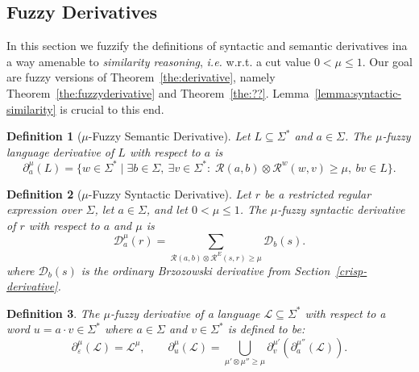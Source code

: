 \documentclass{article}
\def\ie{{\em i.e. }}
\newcommand{\cR}{{\mathcal R}}
\def\cut{\mu}
\newtheorem{definition}{Definition}[section]
\begin{document}

\subsection{Fuzzy Derivatives}\label{sec:fuzzyderivatives}
In this section we fuzzify the definitions of syntactic and semantic derivatives ina a way amenable to {\em similarity reasoning}, \ie  w.r.t. a cut value $0<\mu\leq 1$. Our goal are fuzzy versions  of Theorem~\ref{the:derivative}, namely Theorem~\ref{the:fuzzyderivative} and Theorem~\ref{the:??}. Lemma~\ref{lemma:syntactic-similarity} is crucial to this end. 

\begin{definition}[$\mu$-Fuzzy Semantic Derivative]\label{fuzzyderivative}
Let ${L}\subseteq\Sigma^*$ and $a\in\Sigma$. The \emph{$\cut$-fuzzy
language derivative} of ${L}$ with respect to $a$ is
$$
\partial_a^\cut({L})
=
\{w \in \Sigma^* \mid
  \exists b \in \Sigma,\ \exists v\in\Sigma^*
  :\;
  \cR(a,b)\otimes \mathcal{R}^w(w,v)\ge\cut,\ bv \in {L}
\}.
$$
\end{definition}

\begin{definition}[$\mu$-Fuzzy Syntactic Derivative]\label{def:regex-fuzzy-derivative}
Let $r$ be a restricted regular expression over $\Sigma$, let $a\in\Sigma$, and let
$0<\cut\le 1$. The \emph{$\mu$-fuzzy syntactic derivative} of $r$ with respect to $a$ and
$\cut$ is
\[
  \mathcal D_a^\cut(r)
  =
  \sum_{\mathcal R(a, b)\otimes \mathcal R^{E}( s, r)\geq \mu}
  \mathcal D_b(s).
\]
where $\mathcal D_b(s)$ is the ordinary Brzozowski derivative from
Section~\ref{crisp-derivative}. 
\end{definition}

\begin{definition}\label{def:fuzzy-word-derivative}
    The $\mu$-fuzzy derivative of a language $\mathcal{L} \subseteq \Sigma^*$ with respect to a word $u=a\cdot v \in \Sigma^*$ where $a \in \Sigma$ and $v \in \Sigma^*$ is defined to be:
    $$
    \partial^\cut_\varepsilon(\mathcal{L}) = \mathcal{L}^\cut,
    \qquad
    \partial^\cut_u(\mathcal{L}) = \bigcup_{\cut'\otimes \cut''\geq \cut}\partial^{\cut'}_v(\partial^{\cut''}_a(\mathcal{L})).
    $$
\end{definition}
\end{document}
